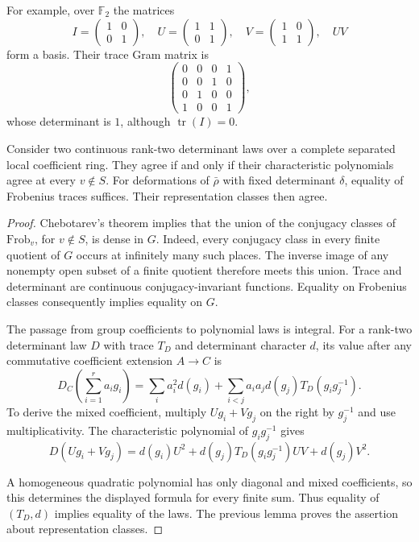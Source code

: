 For example, over $\mathbb F_2$ the matrices
\[
 I=\begin{pmatrix}1&0\\0&1\end{pmatrix},\quad
 U=\begin{pmatrix}1&1\\0&1\end{pmatrix},\quad
 V=\begin{pmatrix}1&0\\1&1\end{pmatrix},\quad UV
\]
form a basis. Their trace Gram matrix is
\[
 \begin{pmatrix}
 0&0&0&1\\0&0&1&0\\0&1&0&0\\1&0&0&1
 \end{pmatrix},
\]
whose determinant is $1$, although $\operatorname{tr}(I)=0$.

\begin{lemma}
\label{v4-arith:ic:w10-e:frobenius-law}
Consider two continuous rank-two determinant laws over a complete
separated local coefficient ring. They agree if and only if their
characteristic polynomials agree at every $v\notin S$.
For deformations of $\bar\rho$ with fixed determinant $\delta$,
equality of Frobenius traces suffices. Their representation classes
then agree.
\end{lemma}

\begin{proof}
Chebotarev's theorem implies that the union of the conjugacy classes
of $\mathrm{Frob}_v$, for $v\notin S$, is dense in $G$.
Indeed, every conjugacy class in every finite quotient of $G$ occurs
at infinitely many such places. The inverse image of any nonempty
open subset of a finite quotient therefore meets this union.
Trace and determinant are continuous conjugacy-invariant functions.
Equality on Frobenius classes consequently implies equality on $G$.

The passage from group coefficients to polynomial laws is integral.
For a rank-two determinant law $D$ with trace $T_D$ and determinant
character $d$, its value after any commutative coefficient extension
$A\to C$ is
\[
 D_C\left(\sum_{i=1}^r a_i g_i\right)
 =\sum_i a_i^2d(g_i)
  +\sum_{i<j}a_i a_jd(g_j)T_D(g_i g_j^{-1}).
\]
To derive the mixed coefficient, multiply $Ug_i+Vg_j$ on the right
by $g_j^{-1}$ and use multiplicativity. The characteristic polynomial
of $g_i g_j^{-1}$ gives
\[
 D(Ug_i+Vg_j)
 =d(g_i)U^2+d(g_j)T_D(g_i g_j^{-1})UV+d(g_j)V^2.
\]

A homogeneous quadratic polynomial has only diagonal and mixed
coefficients, so this determines the displayed formula for every
finite sum. Thus equality of $(T_D,d)$ implies equality of the laws.
The previous lemma proves the assertion about representation classes.
\end{proof}

